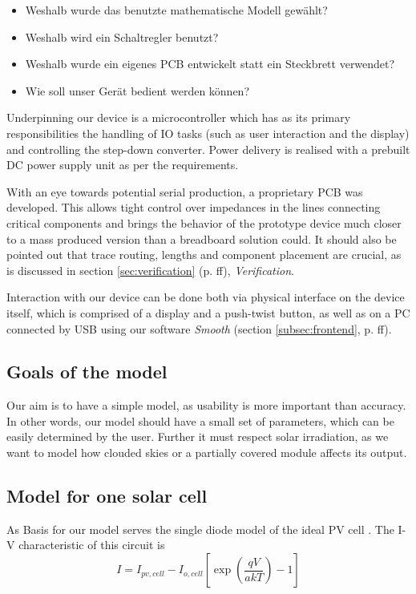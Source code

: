 \begin{itemize}
    \item
        Weshalb wurde das benutzte mathematische Modell gew\"ahlt?
    \item
        Weshalb wird ein Schaltregler benutzt?
    \item
        Weshalb wurde ein eigenes PCB entwickelt statt ein Steckbrett verwendet?
    \item
        Wie soll unser Ger\"at bedient werden k\"onnen?
\end{itemize}

Underpinning  our  device  is  a  microcontroller which  has  as  its  primary
responsibilities the  handling of IO tasks  (such as user interaction  and the
display) and  controlling the step-down converter. Power  delivery is realised
with a prebuilt DC power supply unit as per the requirements.

With  an  eye towards  potential  serial  production,  a proprietary  PCB  was
developed.  This allows tight control  over impedances in the lines connecting
critical  components and  brings the  behavior  of the  prototype device  much
closer  to  a mass  produced  version  than  a breadboard  solution  could. It
should  also  be  pointed  out  that  trace  routing,  lengths  and  component
placement are crucial,  as is discussed in  section \ref{sec:verification} (p.
\pageref{sec:verification}ff), \emph{Verification}.

Interaction with  our device can  be done both  via physical interface  on the
device itself,  which is comprised  of a display  and a push-twist  button, as
well as  on a PC  connected by USB  using our software  \emph{Smooth} (section
\ref{subsec:frontend}, p. \pageref{subsec:frontend}ff).

\subsection{Goals of the model}
Our aim is to have a simple model, as usability is more important than accuracy. In other words, our model should have a small set of parameters, which can be easily determined by the user. Further it must respect solar irradiation, as we want to model how clouded skies or a partially covered module affects its output.

\subsection{Model for one solar cell}
As Basis for our model serves the single diode model of the ideal PV cell . The I-V characteristic of this circuit is
\begin{equation}
 I = I_{pv,cell} - I_{o,cell} \left[ \exp \left( \frac{qV}{akT} \right) - 1 \right]
 \end{equation}
